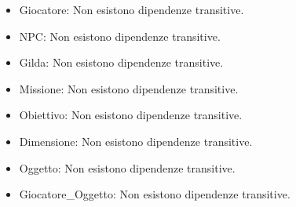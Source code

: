 \documentclass{article}
\begin{document}
\begin{itemize}
    \item Giocatore: Non esistono dipendenze transitive.
    \item NPC: Non esistono dipendenze transitive.
    \item Gilda: Non esistono dipendenze transitive.
    \item Missione: Non esistono dipendenze transitive.
    \item Obiettivo: Non esistono dipendenze transitive.
    \item Dimensione: Non esistono dipendenze transitive.
    \item Oggetto: Non esistono dipendenze transitive.
    \item Giocatore\_Oggetto: Non esistono dipendenze transitive.
\end{itemize}
\end{document}
